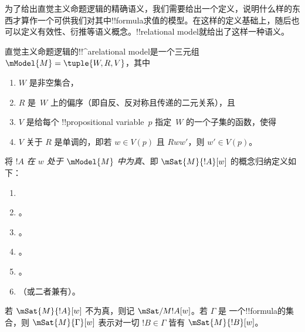 \documentclass[../../../include/open-logic-section]{subfiles}
\begin{document}


为了给出直觉主义命题逻辑的精确语义，我们需要给出一个定义，说明什么样的东西才算作一个可供我们对其中!!{formula}求值的模型。在这样的定义基础上，随后也可以定义有效性、衍推等语义概念。!!{relational model}就给出了这样一种语义。

\begin{defn}
  直觉主义命题逻辑的!!^a{relational model}是一个三元组
  $\mModel{M} = \tuple{W, R, V}$，其中
  \begin{enumerate}
  \item $W$ 是非空集合，
  \item $R$ 是~$W$ 上的偏序（即自反、反对称且传递的二元关系），且
  \item $V$ 是给每个 !!{propositional
    variable}~$p$ 指定~$W$ 的一个子集的函数，使得
  \item $V$ 关于 $R$ 是单调的，即若 $w
    \in V(p)$ 且 $Rww'$，则 $w' \in V(p)$。
  \end{enumerate}
\end{defn}

\begin{defn}
  将 $!A$ \emph{在 $w$ 处于
    $\mModel{M}$ 中为真}、即 $\mSat{M}{!A}[w]$ 的概念归纳定义如下：
  \begin{enumerate}
  \item {}
  \item {}。
  \item {}。
  \item {}。
  \item {}。
  \item {}（或二者兼有）。
  \end{enumerate}
  若 $\mSat{M}{!A}[w]$ 不为真，则记 $\mSat/{M}{!A}[w]$。若 $\Gamma$ 是
  一个!!{formula}的集合，则 $\mSat{M}{\Gamma}[w]$ 表示对一切 $!B \in \Gamma$
  皆有 $\mSat{M}{!B}[w]$。
\end{defn}
\end{document}
